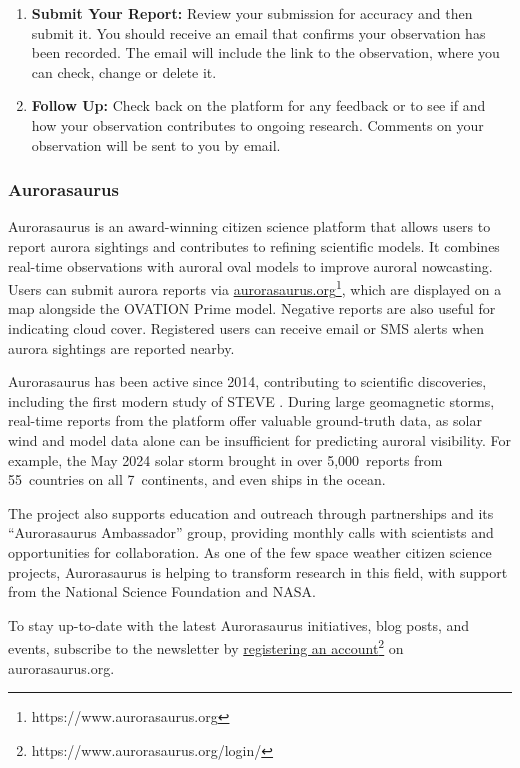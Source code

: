 \documentclass{article}
\renewcommand{\cite}[1]{\parencite{#1}}
\begin{document}
\begin{enumerate}
    \item \textbf{Submit Your Report:} Review your submission for accuracy and then submit it. You should receive an email that confirms your observation has been recorded.  The email will include the link to the observation, where you can check, change or delete it. 
    
    \item \textbf{Follow Up:} Check back on the platform for any feedback or to see if and how your observation contributes to ongoing research. Comments on your observation will be sent to you by email.
\end{enumerate}


\subsubsection{Aurorasaurus}\label{aurorasaurus}%

Aurorasaurus \cite{MacDonald2015} is an award-winning citizen science platform that allows users to report aurora sightings and contributes to refining scientific models. It combines real-time observations with auroral oval models to improve auroral nowcasting. Users can submit aurora reports via \href{https://www.aurorasaurus.org/}{aurorasaurus.org}\footnote{https://www.aurorasaurus.org}, which are displayed on a map alongside the OVATION Prime model. Negative reports are also useful for indicating cloud cover. Registered users can receive email or SMS alerts when aurora sightings are reported nearby.

Aurorasaurus has been active since 2014, contributing to scientific discoveries, including the first modern study of STEVE \cite{MacDonald2018}. During large geomagnetic storms, real-time reports from the platform offer valuable ground-truth data, as solar wind and model data alone can be insufficient for predicting auroral visibility. For example, the May 2024 solar storm brought in over 5,000~reports from 55~countries on all 7~continents, and even ships in the ocean.

The project also supports education and outreach through partnerships and its ``Aurorasaurus Ambassador'' group, providing monthly calls with scientists and opportunities for collaboration. As one of the few space weather citizen science projects, Aurorasaurus is helping to transform research in this field, with support from the National Science Foundation and NASA.

To stay up-to-date with the latest Aurorasaurus initiatives, blog posts, and events, subscribe to the newsletter by \href{https://www.aurorasaurus.org/login/}{registering an account}\footnote{https://www.aurorasaurus.org/login/} on aurorasaurus.org.
\end{document}
